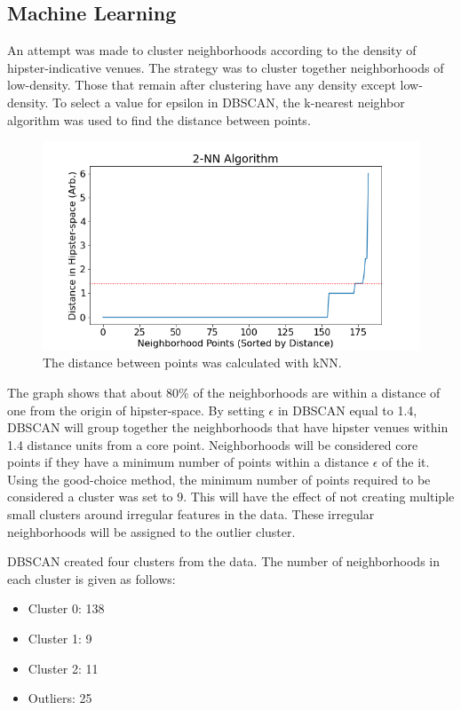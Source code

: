 \documentclass[12pt]{article}
\begin{document}
\subsection{Machine Learning}
	An attempt was made to cluster neighborhoods according to the density of hipster-indicative venues.
	The strategy was to cluster together neighborhoods of low-density.
	Those that remain after clustering have any density except low-density.
	To select a value for epsilon in DBSCAN, the k-nearest neighbor algorithm was used to find the distance between points.
\begin{figure}[H]
  \includegraphics[width=6.5in]{knn.png}
  \caption{The distance between points was calculated with kNN.}
  \label{fig:knn}
\end{figure}
	The graph shows that about 80\% of the neighborhoods are within a distance of one from the origin of hipster-space.
	By setting $\epsilon$ in DBSCAN equal to 1.4, DBSCAN will group together the neighborhoods that have hipster venues within 1.4 distance units from a core point.
	Neighborhoods will be considered core points if they have a minimum number of points within a distance $\epsilon$ of the it.
	Using the good-choice method, the minimum number of points required to be considered a cluster was set to 9.
	This will have the effect of not creating multiple small clusters around irregular features in the data.
	These irregular neighborhoods will be assigned to the outlier cluster.

	DBSCAN created four clusters from the data.
	The number of neighborhoods in each cluster is given as follows:
\begin{itemize}[noitemsep]
	\item Cluster 0:	138
	\item Cluster 1:	9
	\item Cluster 2:	11
	\item Outliers:		25
\end{itemize}
\end{document}
